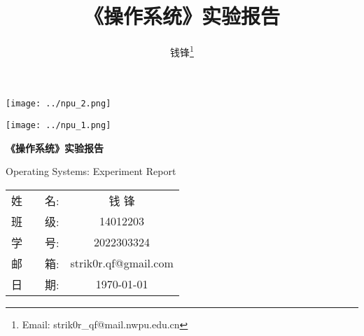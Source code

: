 \documentclass[10pt,UTF8]{book} %
\title{\textbf{《操作系统》}实验报告}
\author{钱锋\thanks{Email: strik0r\_qf@mail.nwpu.edu.cn}}
\begin{document}

\pagestyle{empty}

\begin{titlepage}
    \thispagestyle{empty}
    \centering
        \vspace*{2cm}
        \texttt{[image: ../npu\_2.png]}\par
        \vspace{1em}
        \texttt{[image: ../npu\_1.png]}\par
    \vspace{2em}
        \begin{center}
            \Huge \heiti \textbf{《操作系统》实验报告}

            Operating Systems: Experiment Report
        \end{center}
        \vspace{3cm}
        \begin{center}
        \songti
        \renewcommand\arraystretch{1.5}
	\begin{tabular}{p{2cm} c c}
    {姓\,\,\,\,\,\,\,\,\,\,\,\,名:} & \multicolumn{2}{c}{钱 \quad\quad 锋}\\
    \cline{2-3}
    {班\,\,\,\,\,\,\,\,\,\,\,\,级:} & \multicolumn{2}{c}{14012203} \\
    \cline{2-3}
    {学\,\,\,\,\,\,\,\,\,\,\,\,号:} & \multicolumn{2}{c}{2022303324}\\
    \cline{2-3}
    {邮\,\,\,\,\,\,\,\,\,\,\,\,箱:} & \multicolumn{2}{c}{strik0r.qf@gmail.com}\\
    \cline{2-3}
    {日\,\,\,\,\,\,\,\,\,\,\,\,期:} & \multicolumn{2}{c}{\today}\\
    \cline{2-3}
	\end{tabular}
    \end{center}
\end{titlepage}
\cleardoublepage
\maketitle

\frontmatter
\newpage
\pagestyle{plain}
\makeatother

% 

\end{document}

